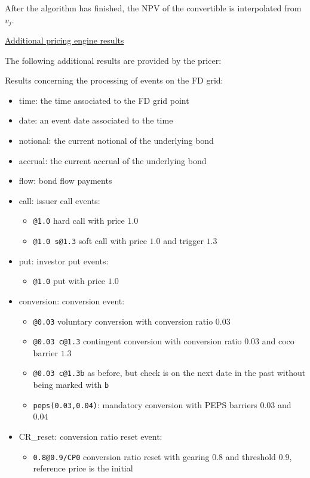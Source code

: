 After the algorithm has finished, the NPV of the convertible is interpolated from $v_j$.

\underline{Additional pricing engine results}

The following additional results are provided by the pricer:

Results concerning the processing of events on the FD grid:

\begin{itemize}
\item time: the time associated to the FD grid point
\item date: an event date associated to the time
\item notional: the current notional of the underlying bond
\item accrual: the current accrual of the underlying bond
\item flow: bond flow payments
\item call: issuer call events:
  \begin{itemize}
  \item \verb+@1.0+ hard call with price $1.0$
  \item \verb+@1.0 s@1.3+ soft call with price $1.0$ and trigger $1.3$
  \end{itemize}
\item put: investor put events:
  \begin{itemize}
  \item \verb+@1.0+ put with price $1.0$
  \end{itemize}
\item conversion: conversion event:
  \begin{itemize}
  \item \verb+@0.03+ voluntary conversion with conversion ratio $0.03$
  \item \verb+@0.03 c@1.3+ contingent conversion with conversion ratio $0.03$ and coco barrier $1.3$
  \item \verb+@0.03 c@1.3b+ as before, but check is on the next date in the past without being marked with \verb+b+
  \item \verb+peps(0.03,0.04)+: mandatory conversion with PEPS barriers $0.03$ and $0.04$
  \end{itemize}
\item CR\_reset: conversion ratio reset event:
  \begin{itemize}
  \item \verb+0.8@0.9/CP0+ conversion ratio reset with gearing $0.8$ and threshold $0.9$, reference price is the initial

\end{itemize}
\end{itemize}
